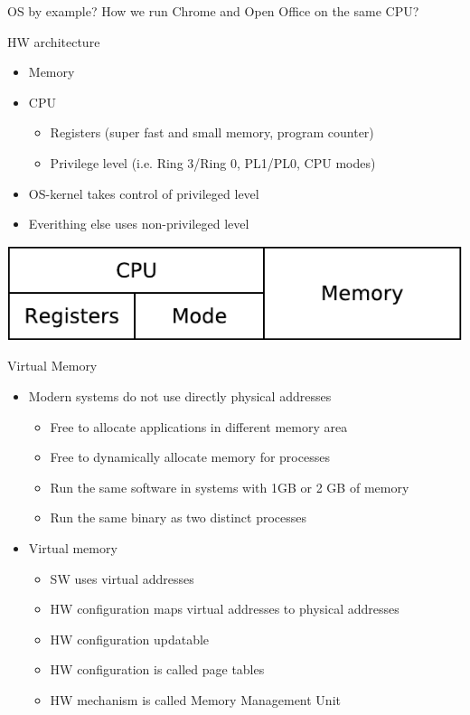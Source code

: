 \documentclass{beamer}
\begin{document}
\begin{frame}{OS by example?}
  How we run Chrome and Open Office on the same CPU?
\end{frame}

\begin{frame}{HW architecture}
  \begin{itemize}
  \item Memory
  \item CPU
    \begin{itemize}
    \item Registers (super fast and small memory, program counter)
    \item Privilege level (i.e. Ring 3/Ring 0, PL1/PL0, CPU modes)
    \end{itemize}
  \item OS-kernel takes control of privileged level
  \item Everithing else uses non-privileged level
  \end{itemize}
  \begin{center}
  \includegraphics[width=0.5\linewidth]{hw}
  \end{center}
\end{frame}

\begin{frame}{Virtual Memory}
  \begin{itemize}
  \item Modern systems do not use directly physical addresses
    \begin{itemize}
    \item Free to allocate applications in different memory area
    \item Free to dynamically allocate memory for processes
    \item Run the same software in systems with 1GB or 2 GB of memory
    \item Run the same binary as two distinct processes
    \end{itemize}
  \item Virtual memory
    \begin{itemize}
    \item SW uses virtual addresses
    \item HW configuration maps virtual addresses to physical addresses
    \item HW configuration updatable
    \item HW configuration is called page tables
    \item HW mechanism is called Memory Management Unit
    \end{itemize}
  \end{itemize}
\end{frame}
\end{document}
